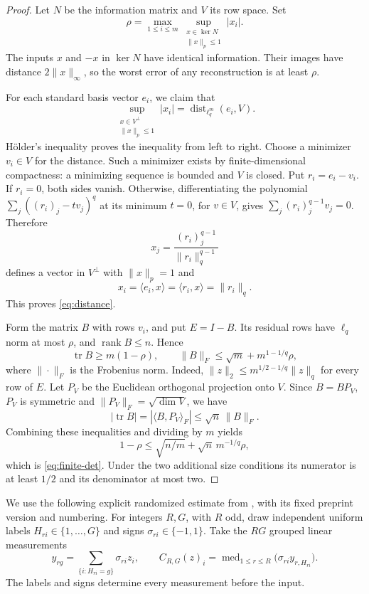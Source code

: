 \documentclass[11pt]{article}
\newcommand{\rank}{\operatorname{rank}}
\newcommand{\tr}{\operatorname{tr}}
\newcommand{\dist}{\operatorname{dist}}
\newcommand{\med}{\operatorname{med}}
\begin{document}
\begin{proof}
Let \(N\) be the information matrix and \(V\) its row space. Set
\[
 \rho=\max_{1\le i\le m}
       \sup_{\substack{x\in\ker N\\\|x\|_p\le1}}|x_i|.
\]
The inputs \(x\) and \(-x\) in \(\ker N\) have identical information.
Their images have distance \(2\|x\|_\infty\), so the worst error of any
reconstruction is at least \(\rho\).

For each standard basis vector \(e_i\), we claim that
\begin{equation}\label{eq:distance}
 \sup_{\substack{x\in V^\perp\\\|x\|_p\le1}}|x_i|
       =\dist_{\ell_q^m}(e_i,V).
\end{equation}
H\"older's inequality proves the inequality from left to right.
Choose a minimizer \(v_i\in V\) for the distance. Such a minimizer exists
by finite-dimensional compactness: a minimizing sequence is bounded and
\(V\) is closed. Put \(r_i=e_i-v_i\). If \(r_i=0\), both sides vanish.
Otherwise, differentiating the polynomial
\(\sum_j((r_i)_j-tv_j)^q\) at its minimum \(t=0\), for \(v\in V\), gives
\(\sum_j(r_i)_j^{q-1}v_j=0\). Therefore
\[
 x_j=\frac{(r_i)_j^{q-1}}{\|r_i\|_q^{q-1}}
\]
defines a vector in \(V^\perp\) with \(\|x\|_p=1\) and
\[
 x_i=\langle e_i,x\rangle
     =\langle r_i,x\rangle=\|r_i\|_q.
\]
This proves \eqref{eq:distance}.

Form the matrix \(B\) with rows \(v_i\), and put \(E=I-B\). Its residual
rows have \(\ell_q\) norm at most \(\rho\), and \(\rank B\le n\). Hence
\[
 \tr B\ge m(1-\rho),\qquad
 \|B\|_F\le\sqrt m+m^{1-1/q}\rho,
\]
where \(\|\cdot\|_F\) is the Frobenius norm. Indeed,
\(\|z\|_2\le m^{1/2-1/q}\|z\|_q\) for every row of \(E\).
Let \(P_V\) be the Euclidean orthogonal projection onto \(V\).
Since \(B=BP_V\), \(P_V\) is symmetric and
\(\|P_V\|_F=\sqrt{\dim V}\), we have
\[
 |\tr B|=|\langle B,P_V\rangle_F|\le\sqrt n\,\|B\|_F.
\]
Combining these inequalities and dividing by \(m\) yields
\[
 1-\rho\le\sqrt{n/m}+\sqrt n\,m^{-1/q}\rho,
\]
which is \eqref{eq:finite-det}. Under the two additional size conditions
its numerator is at least \(1/2\) and its denominator at most two.
\end{proof}

We use the following explicit randomized estimate from
\cite[Proposition 4.1]{KW}, with its fixed preprint version and numbering.
For integers \(R,G\), with \(R\) odd, draw independent uniform labels
\(H_{ri}\in\{1,\ldots,G\}\) and signs \(\sigma_{ri}\in\{-1,1\}\).
Take the \(RG\) grouped linear measurements
\[
 y_{rg}=\sum_{\{i:H_{ri}=g\}}\sigma_{ri}z_i,
 \qquad
 C_{R,G}(z)_i=\med_{1\le r\le R}
                   \bigl(\sigma_{ri}y_{r,H_{ri}}\bigr).
\]
The labels and signs determine every measurement before the input.
\end{document}
